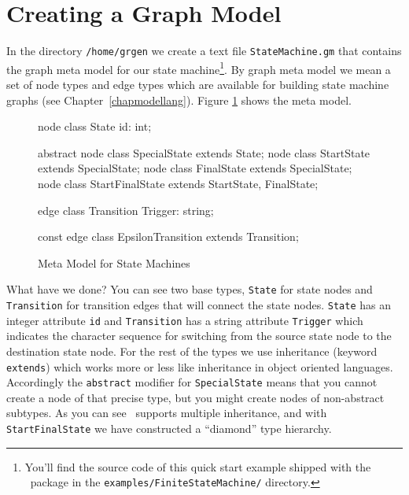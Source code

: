 \section{Creating a Graph Model}
In the directory \texttt{/home/grgen} we create a text file \texttt{StateMachine.gm} that contains the graph meta model for our state machine\footnote{You'll find the source code of this quick start example shipped with the \GrG\ package in the \texttt{examples/FiniteStateMachine/} directory.}.
By graph meta model we mean a set of node types and edge types which are available for building state machine graphs (see Chapter~\ref{chapmodellang}).
Figure \ref{fig:quick:mm} shows the meta model.
\begin{figure}[htbp]
    \centering
    \begin{grgen}
node class State {
    id: int;
}

abstract node class SpecialState extends State;
node class StartState extends SpecialState;
node class FinalState extends SpecialState;
node class StartFinalState extends StartState, FinalState;

edge class Transition {
    Trigger: string;
}

const edge class EpsilonTransition extends Transition;    
    \end{grgen}
    \caption{Meta Model for State Machines}
    \label{fig:quick:mm}
\end{figure}    
What have we done?
You can see two base types, \texttt{State} for state nodes and \texttt{Transition} for transition edges that will connect the state nodes.
\texttt{State} has an integer attribute \texttt{id} and \texttt{Transition} has a string attribute \texttt{Trigger} which indicates the character sequence for switching from the source state node to the destination state node.
For the rest of the types we use inheritance (keyword \texttt{extends}) which works more or less like inheritance in object oriented languages.
Accordingly the \texttt{abstract} modifier for \texttt{SpecialState} means that you cannot create a node of that precise type, but you might create nodes of non-abstract subtypes.
As you can see \GrG\ supports multiple inheritance, and with \texttt{StartFinalState} we have constructed a ``diamond'' type hierarchy.

